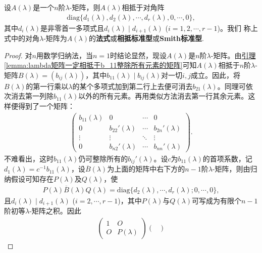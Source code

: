 \documentclass[../../main.tex]{subfiles}
\begin{document}
\begin{theorem}\label{theorem:lambda矩阵相抵于特殊的对角阵}
设$A(\lambda)$是一个$n$阶$\lambda$-矩阵，则$A(\lambda)$相抵于对角阵
\begin{align}
\mathrm{diag}\{d_1(\lambda),d_2(\lambda),\cdots,d_r(\lambda),0,\cdots,0\},\label{theorem0.1-7.1.1}
\end{align}
其中$d_i(\lambda)$是非零首一多项式且$d_i(\lambda)\mid d_{i + 1}(\lambda)$ ($i = 1,2,\cdots,r - 1$)。我们
称上式中的对角$\lambda$-矩阵为$A(\lambda)$的\textbf{法式}或\textbf{相抵标准型}或\textbf{Smith标准型}. 
\end{theorem}
\begin{proof}
对$n$用数学归纳法，当$n = 1$时结论显然，现设$A(\lambda)$是$n$阶$\lambda$-矩阵。由\hyperref[lemma:lambda矩阵一定相抵于b_11整除所有元素的矩阵]{引理\ref{lemma:lambda矩阵一定相抵于b_11整除所有元素的矩阵}}可知$A(\lambda)$相抵于$n$阶$\lambda$-矩阵$B(\lambda)=(b_{ij}(\lambda))$，其中$b_{11}(\lambda)\mid b_{ij}(\lambda)$对一切$i,j$成立。因此，将$B(\lambda)$的第一行乘以$\lambda$的某个多项式加到第二行上去便可消去$b_{21}(\lambda)$。同理可依次消去第一列除$b_{11}(\lambda)$以外的所有元素。再用类似方法消去第一行其余元素。这样便得到了一个矩阵：
\begin{align*}
\begin{pmatrix}
b_{11}(\lambda)&0&\cdots&0\\
0&b_{22}'(\lambda)&\cdots&b_{2n}'(\lambda)\\
\vdots&\vdots&\ddots&\vdots\\
0&b_{n2}'(\lambda)&\cdots&b_{nn}'(\lambda)
\end{pmatrix}.
\end{align*}
不难看出，这时$b_{11}(\lambda)$仍可整除所有的$b_{ij}'(\lambda)$。设$c$为$b_{11}(\lambda)$的首项系数，记$d_1(\lambda)=c^{-1}b_{11}(\lambda)$，设$\overline{B}(\lambda)$为上面的矩阵中右下方的$n - 1$阶$\lambda$-矩阵，则由归纳假设可知存在$P(\lambda)$及$Q(\lambda)$，使
\begin{align*}
P(\lambda)\overline{B}(\lambda)Q(\lambda)=\mathrm{diag}\{d_2(\lambda),\cdots,d_r(\lambda);0,\cdots,0\},
\end{align*}
且$d_i(\lambda)\mid d_{i + 1}(\lambda)$ ($i = 2,\cdots,r - 1$)，其中$P(\lambda)$与$Q(\lambda)$可写成为有限个$n - 1$阶初等$\lambda$-矩阵之积。因此
\begin{align*}
\begin{pmatrix}
1&O\\
O&P(\lambda)
\end{pmatrix}
\begin{pmatrix}

\end{pmatrix}
\end{align*}
\end{proof}
\end{document}
